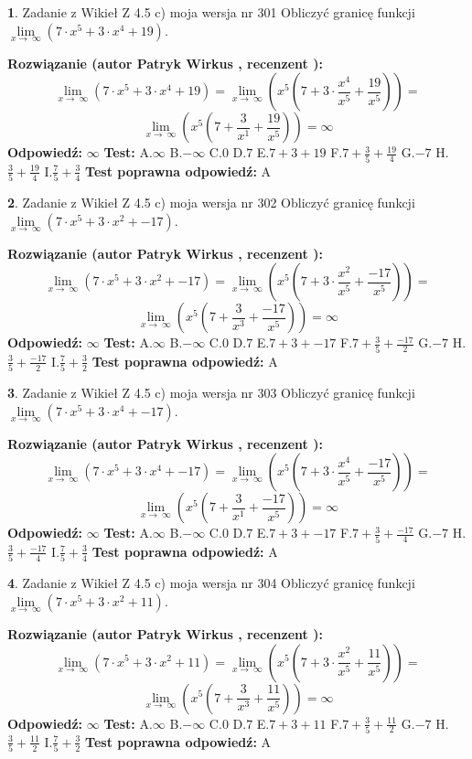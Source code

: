 \documentclass[12pt, a4paper]{article}
\theoremstyle{definition} %
\newtheorem{zad}{}
\newcommand{\zadStart}[1]{\begin{zad}#1\newline}
\newcommand{\zadStop}{\end{zad}}
\newcommand{\rozwStart}[2]{\noindent \textbf{Rozwiązanie (autor #1 , recenzent #2): }\newline}
\newcommand{\rozwStop}{\newline}
\newcommand{\odpStart}{\noindent \textbf{Odpowiedź:}\newline}
\newcommand{\odpStop}{\newline}
\newcommand{\testStart}{\noindent \textbf{Test:}\newline}
\newcommand{\testStop}{\newline}
\newcommand{\kluczStart}{\noindent \textbf{Test poprawna odpowiedź:}\newline}
\newcommand{\kluczStop}{\newline}
\begin{document}
\zadStart{Zadanie z Wikieł Z 4.5 c) moja wersja nr 301}
Obliczyć granicę funkcji  $\lim\limits_{x\to\ \infty}(7 \cdot x^{5}+3 \cdot x^{4}+19)$.
\zadStop
\rozwStart{Patryk Wirkus}{}
$$\lim\limits_{x\to\ \infty}(7 \cdot x^{5}+3 \cdot x^{4}+19) = \lim\limits_{x\to\ \infty}(x^{5}(7 +3 \cdot \frac{x^{4}}{x^{5}}+\frac{19}{x^{5}})) =$$ $$\lim\limits_{x\to\ \infty}(x^{5}(7 +\frac{3}{x^{1}}+\frac{19}{x^{5}})) =\infty$$
\rozwStop
\odpStart
$\infty$
\odpStop
\testStart
A.$\infty$ B.$-\infty$ C.$0$ D.$7$ E.$7 + 3 + 19$
F.$7+\frac{3}{5}+\frac{19}{4}$ G.$-7$
H.$\frac{3}{5}+\frac{19}{4}$
I.$\frac{7}{5}+\frac{3}{4}$
\testStop
\kluczStart
A
\kluczStop



\zadStart{Zadanie z Wikieł Z 4.5 c) moja wersja nr 302}
Obliczyć granicę funkcji  $\lim\limits_{x\to\ \infty}(7 \cdot x^{5}+3 \cdot x^{2}+-17)$.
\zadStop
\rozwStart{Patryk Wirkus}{}
$$\lim\limits_{x\to\ \infty}(7 \cdot x^{5}+3 \cdot x^{2}+-17) = \lim\limits_{x\to\ \infty}(x^{5}(7 +3 \cdot \frac{x^{2}}{x^{5}}+\frac{-17}{x^{5}})) =$$ $$\lim\limits_{x\to\ \infty}(x^{5}(7 +\frac{3}{x^{3}}+\frac{-17}{x^{5}})) =\infty$$
\rozwStop
\odpStart
$\infty$
\odpStop
\testStart
A.$\infty$ B.$-\infty$ C.$0$ D.$7$ E.$7 + 3 + -17$
F.$7+\frac{3}{5}+\frac{-17}{2}$ G.$-7$
H.$\frac{3}{5}+\frac{-17}{2}$
I.$\frac{7}{5}+\frac{3}{2}$
\testStop
\kluczStart
A
\kluczStop



\zadStart{Zadanie z Wikieł Z 4.5 c) moja wersja nr 303}
Obliczyć granicę funkcji  $\lim\limits_{x\to\ \infty}(7 \cdot x^{5}+3 \cdot x^{4}+-17)$.
\zadStop
\rozwStart{Patryk Wirkus}{}
$$\lim\limits_{x\to\ \infty}(7 \cdot x^{5}+3 \cdot x^{4}+-17) = \lim\limits_{x\to\ \infty}(x^{5}(7 +3 \cdot \frac{x^{4}}{x^{5}}+\frac{-17}{x^{5}})) =$$ $$\lim\limits_{x\to\ \infty}(x^{5}(7 +\frac{3}{x^{1}}+\frac{-17}{x^{5}})) =\infty$$
\rozwStop
\odpStart
$\infty$
\odpStop
\testStart
A.$\infty$ B.$-\infty$ C.$0$ D.$7$ E.$7 + 3 + -17$
F.$7+\frac{3}{5}+\frac{-17}{4}$ G.$-7$
H.$\frac{3}{5}+\frac{-17}{4}$
I.$\frac{7}{5}+\frac{3}{4}$
\testStop
\kluczStart
A
\kluczStop



\zadStart{Zadanie z Wikieł Z 4.5 c) moja wersja nr 304}
Obliczyć granicę funkcji  $\lim\limits_{x\to\ \infty}(7 \cdot x^{5}+3 \cdot x^{2}+11)$.
\zadStop
\rozwStart{Patryk Wirkus}{}
$$\lim\limits_{x\to\ \infty}(7 \cdot x^{5}+3 \cdot x^{2}+11) = \lim\limits_{x\to\ \infty}(x^{5}(7 +3 \cdot \frac{x^{2}}{x^{5}}+\frac{11}{x^{5}})) =$$ $$\lim\limits_{x\to\ \infty}(x^{5}(7 +\frac{3}{x^{3}}+\frac{11}{x^{5}})) =\infty$$
\rozwStop
\odpStart
$\infty$
\odpStop
\testStart
A.$\infty$ B.$-\infty$ C.$0$ D.$7$ E.$7 + 3 + 11$
F.$7+\frac{3}{5}+\frac{11}{2}$ G.$-7$
H.$\frac{3}{5}+\frac{11}{2}$
I.$\frac{7}{5}+\frac{3}{2}$
\testStop
\kluczStart
A
\kluczStop
\end{document}
